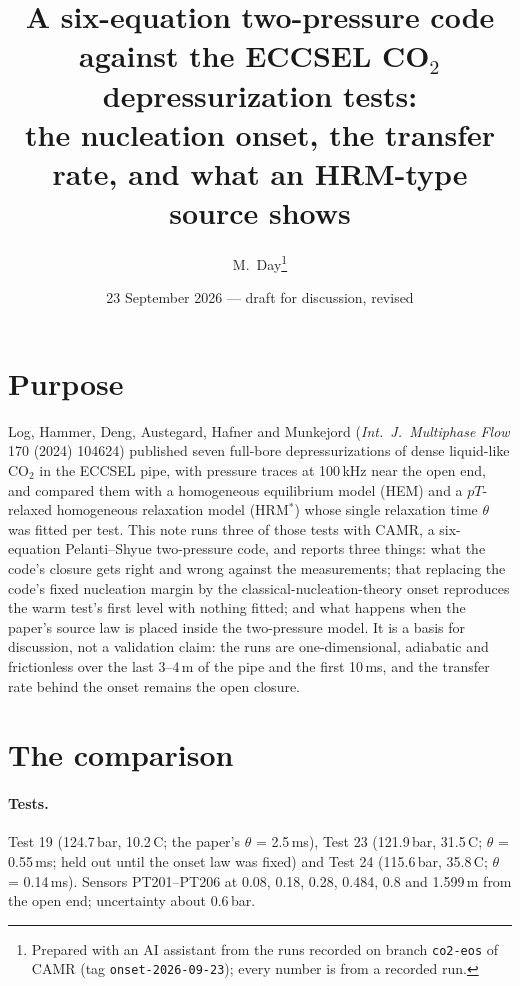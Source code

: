 \documentclass[11pt,a4paper]{article}
\title{A six-equation two-pressure code against the ECCSEL CO$_2$ depressurization tests:\\ the nucleation onset, the transfer rate, and what an HRM-type source shows}
\author{M.\ Day\thanks{Prepared with an AI assistant from the runs recorded on branch \texttt{co2-eos} of CAMR (tag \texttt{onset-2026-09-23}); every number is from a recorded run.}}
\date{23 September 2026 --- draft for discussion, revised}
\begin{document}
\maketitle

\section*{Purpose}
Log, Hammer, Deng, Austegard, Hafner and Munkejord (\emph{Int.\ J.\ Multiphase Flow} 170 (2024) 104624) published seven full-bore depressurizations of dense liquid-like CO$_2$ in the ECCSEL pipe, with pressure traces at 100\,kHz near the open end, and compared them with a homogeneous equilibrium model (HEM) and a $pT$-relaxed homogeneous relaxation model (HRM$^*$) whose single relaxation time $\theta$ was fitted per test. This note runs three of those tests with CAMR, a six-equation Pelanti--Shyue two-pressure code, and reports three things: what the code's closure gets right and wrong against the measurements; that replacing the code's fixed nucleation margin by the classical-nucleation-theory onset reproduces the warm test's first level with nothing fitted; and what happens when the paper's source law is placed inside the two-pressure model. It is a basis for discussion, not a validation claim: the runs are one-dimensional, adiabatic and frictionless over the last 3--4\,m of the pipe and the first 10\,ms, and the transfer rate behind the onset remains the open closure.

\section{The comparison}
\paragraph{Tests.} Test 19 (124.7\,bar, 10.2\,\textdegree C; the paper's $\theta$ = 2.5\,ms), Test 23 (121.9\,bar, 31.5\,\textdegree C; $\theta$ = 0.55\,ms; held out until the onset law was fixed) and Test 24 (115.6\,bar, 35.8\,\textdegree C; $\theta$ = 0.14\,ms). Sensors PT201--PT206 at 0.08, 0.18, 0.28, 0.484, 0.8 and 1.599\,m from the open end; uncertainty about 0.6\,bar.
\end{document}
